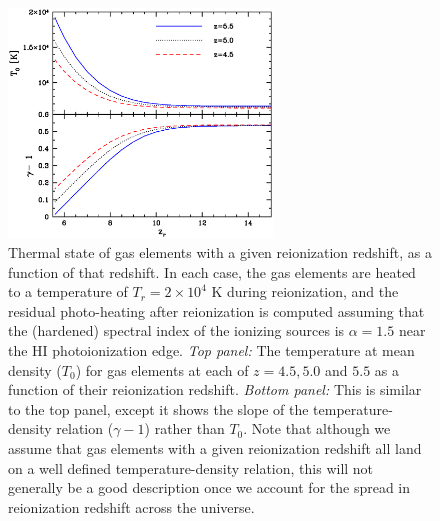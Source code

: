 \begin{figure}
\bc
\includegraphics[width=7cm]{f2.eps}
\caption{Thermal state of gas elements with a given reionization redshift, as a function of that redshift. In each case, the gas elements are heated to
a temperature of $T_r=2 \times 10^4$ K during reionization, and the residual photo-heating after reionization is computed assuming that the
(hardened) spectral index of the ionizing sources is $\alpha=1.5$ near the HI photoionization edge. {\em Top panel:} The temperature
at mean density ($T_0$) for gas elements at each of $z=4.5,5.0$ and $5.5$ as a function of their reionization redshift. {\em Bottom panel:} This is similar to the top panel, except it shows the slope of the temperature-density relation ($\gamma-1$) rather than $T_0$. Note that although we assume that gas
elements with a given reionization redshift all land on a well defined temperature-density relation, this will not generally be
a good description once we account for the spread in reionization redshift across the universe. }
\label{fig:tden_v_zr}
\ec
\end{figure}

